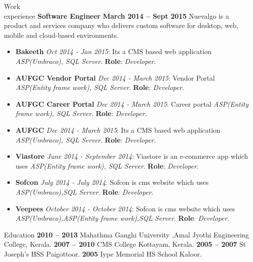 \documentclass{resume}
\begin{document}
\begin{category}{Work \\experience}
  \citemnobullet \textbf{Software Engineer} \hfill \textbf{March 2014 -- Sept 2015}
  \citemnobullet Nuevalgo is a product and services company who delivers custom software for desktop, web, mobile and cloud-based environments.
  \begin{itemize}
  \item \textbf{Bakeeth} {\em Oct 2014 - Jan 2015}: Its a CMS based web application {\em ASP(Umbraco),  SQL Server}. \textbf{Role}: {\em Developer}.  
  \item \textbf{AUFGC Vendor Portal} {\em Dec 2014 - March 2015}: Vendor Portal {\em ASP(Entity frame work),  SQL Server}. \textbf{Role}: {\em Developer}.  
  \item \textbf{AUFGC Career Portal} {\em Dec 2014 - March 2015}: Career portal {\em ASP(Entity frame work),  SQL Server}. \textbf{Role}: {\em Developer}.  
  \item \textbf{AUFGC} {\em Dec 2014 - March 2015}: Its a CMS based web application {\em ASP(Umbraco),  SQL Server}. \textbf{Role}: {\em Developer}.  
  \item \textbf{Viastore} {\em June 2014 - September 2014}: Viastore is an e-commerce app which uses {\em ASP(Entity frame work),  SQL Server}. \textbf{Role}: {\em Developer}.  
  \item \textbf{Sofcon} {\em July 2014 - July 2014}: Sofcon is cms website which uses {\em ASP(Umbraco),SQL Server}. \textbf{Role}: {\em Developer}.
  \item \textbf{Veepees} {\em October 2014 - October 2014}: Sofcon is cms website which uses {\em ASP(Umbraco),ASP(Entity frame work),SQL Server}. \textbf{Role}: {\em Developer}.
  \end{itemize}
  \end{category}


\begin{category}{Education}
   \hfill \textbf{2010 -- 2013}
  \citemnobullet Mahathma Ganghi University ,Amal Jyothi Engineering College, Kerala.
   \hfill \textbf{2007 -- 2010}
  \citemnobullet CMS College Kottayam, Kerala.
   \hfill \textbf{2005 -- 2007}
  \citemnobullet St Joseph's HSS Paigottoor.
    \hfill \textbf{2005}
  \citemnobullet Iype Memorial HS School Kaloor.
\end{category}

\end{document}
